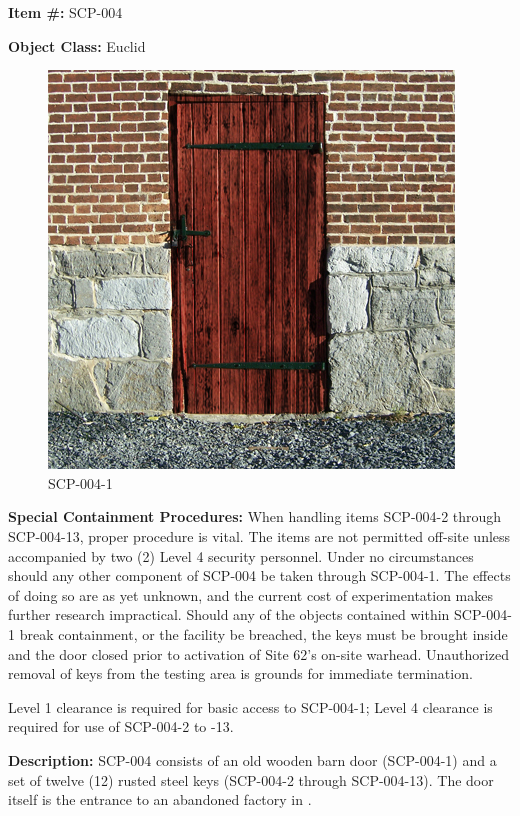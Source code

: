 \textbf{Item \#:} SCP-004

\textbf{Object Class:} Euclid

\begin{figure}[h]
\begin{center}
\includegraphics[scale=1.6]{scp/004.jpg}
\linebreak SCP-004-1
\end{center}
\end{figure}

\textbf{Special Containment Procedures:} When handling items SCP-004-2 through SCP-004-13, proper procedure is vital. The items are not permitted off-site unless accompanied by two (2) Level 4 security personnel. Under no circumstances should any other component of SCP-004 be taken through SCP-004-1. The effects of doing so are as yet unknown, and the current cost of experimentation makes further research impractical. Should any of the objects contained within SCP-004-1 break containment, or the facility be breached, the keys must be brought inside and the door closed prior to activation of Site 62’s on-site warhead. Unauthorized removal of keys from the testing area is grounds for immediate termination.

Level 1 clearance is required for basic access to SCP-004-1; Level 4 clearance is required for use of SCP-004-2 to -13.

\textbf{Description:} SCP-004 consists of an old wooden barn door (SCP-004-1) and a set of twelve (12) rusted steel keys (SCP-004-2 through SCP-004-13). The door itself is the entrance to an abandoned factory in \expunged.
\newpage

